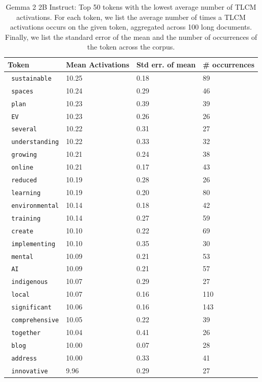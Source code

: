 \begin{table}[h!]
\centering
\caption{Gemma 2 2B Instruct: Top 50 tokens with the lowest average number of TLCM activations. For each token, we list the average number of times a TLCM activations occurs on the given token, aggregated across 100 long documents. Finally, we list the standard error of the mean and the number of occurrences of the token across the corpus.}
\label{table:token_correction_counts_gemma_bottom}
\begin{tabular}{llll}
\toprule
\textbf{Token} & \textbf{Mean Activations} & \textbf{Std err. of mean} & \textbf{\# occurrences} \\
\midrule
\texttt{ sustainable} & 10.25 & 0.18 & 89 \\
\texttt{ spaces} & 10.24 & 0.29 & 46 \\
\texttt{ plan} & 10.23 & 0.39 & 39 \\
\texttt{ EV} & 10.23 & 0.26 & 26 \\
\texttt{ several} & 10.22 & 0.31 & 27 \\
\texttt{ understanding} & 10.22 & 0.33 & 32 \\
\texttt{ growing} & 10.21 & 0.24 & 38 \\
\texttt{ online} & 10.21 & 0.17 & 43 \\
\texttt{ reduced} & 10.19 & 0.28 & 26 \\
\texttt{ learning} & 10.19 & 0.20 & 80 \\
\texttt{ environmental} & 10.14 & 0.18 & 42 \\
\texttt{ training} & 10.14 & 0.27 & 59 \\
\texttt{ create} & 10.10 & 0.22 & 69 \\
\texttt{ implementing} & 10.10 & 0.35 & 30 \\
\texttt{ mental} & 10.09 & 0.21 & 53 \\
\texttt{ AI} & 10.09 & 0.21 & 57 \\
\texttt{ indigenous} & 10.07 & 0.29 & 27 \\
\texttt{ local} & 10.07 & 0.16 & 110 \\
\texttt{ significant} & 10.06 & 0.16 & 143 \\
\texttt{ comprehensive} & 10.05 & 0.22 & 39 \\
\texttt{ together} & 10.04 & 0.41 & 26 \\
\texttt{ blog} & 10.00 & 0.07 & 28 \\
\texttt{ address} & 10.00 & 0.33 & 41 \\
\texttt{ innovative} & 9.96 & 0.29 & 27 \\

\end{tabular}
\end{table}
